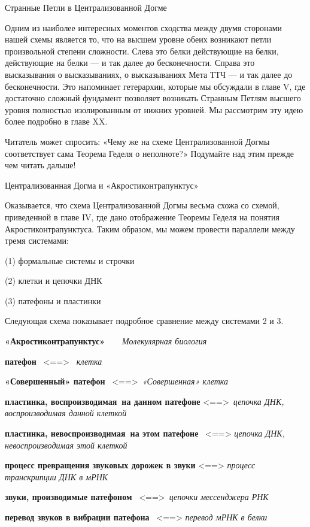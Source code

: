 Странные Петли в Централизованной Догме

Одним из наиболее интересных моментов сходства между двумя сторонами нашей схемы является то, что на высшем уровне обеих возникают петли произвольной степени сложности. Слева это белки действующие на белки, действующие на белки --- и так далее до бесконечности. Справа это высказывания о высказываниях, о высказываниях Мета ТТЧ --- и так далее до бесконечности. Это напоминает гетерархии, которые мы обсуждали в главе V, где достаточно сложный фундамент позволяет возникать Странным Петлям высшего уровня полностью изолированным от нижних уровней. Мы рассмотрим эту идею более подробно в главе XX.

Читатель может спросить: «Чему же на схеме Централизованной Догмы соответствует сама Теорема Геделя о неполноте?» Подумайте над этим прежде чем читать дальше!

Централизованная Догма и «Акростиконтрапунктус»

Оказывается, что схема Централизованной Догмы весьма схожа со схемой, приведенной в главе IV, где дано отображение Теоремы Геделя на понятия Акростиконтрапунктуса. Таким образом, мы можем провести параллели между тремя системами:

(1) формальные системы и строчки

(2) клетки и цепочки ДНК

(3) патефоны и пластинки

Следующая схема показывает подробное сравнение между системами 2 и 3.

\textbf{«Акростиконтрапунктус»~~~} \emph{Молекулярная биология}

\textbf{патефон} ~\textless==\textgreater~ \emph{клетка}

\textbf{«Совершенный» патефон} ~\textless==\textgreater~\emph{«Совершенная» клетка}

\textbf{пластинка, воспроизводимая~на данном патефоне} \textless==\textgreater~\emph{цепочка ДНК, воспроизводимая данной клеткой}

\textbf{пластинка, невоспроизводимая~на этом патефоне} ~\textless==\textgreater{} \emph{цепочка ДНК, невоспроизводимая этой клеткой}

\textbf{процесс превращения звуковых дорожек в звуки} \textless==\textgreater{} \emph{процесс транскрипции ДНК в мРНК}

\textbf{звуки, производимые патефоном} ~\textless==\textgreater~\emph{цепочки мессенджера РНК}

\textbf{перевод звуков в вибрации патефона} ~\textless==\textgreater{} \emph{перевод мРНК в белки}

